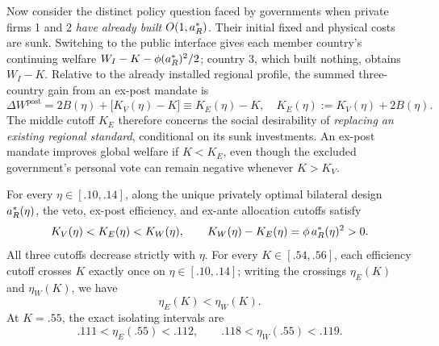 Now consider the distinct policy question faced by governments when private firms 1 and 2 \emph{have already built} \(O(1,a_R^*)\). Their initial fixed and physical costs are sunk. Switching to the public interface gives each member country's continuing welfare
\(W_I-K-\phi(a_R^*)^2/2\); country 3, which built nothing, obtains \(W_I-K\). Relative to the already installed regional profile, the summed three-country gain from an ex-post mandate is
\begin{equation}
 \Delta W^{\mathrm{post}}
 =2B(\eta)+\bigl[K_V(\eta)-K\bigr]
 \equiv K_E(\eta)-K,
 \quad
 K_E(\eta):=K_V(\eta)+2B(\eta).
 \label{eq:ke}
\end{equation}
The middle cutoff \(K_E\) therefore concerns the social desirability of \emph{replacing an existing regional standard}, conditional on its sunk investments. An ex-post mandate improves global welfare if \(K<K_E\), even though the excluded government's personal vote can remain negative whenever \(K>K_V\).

\begin{proposition}
\label{prop:thresholds}
For every \(\eta\in[.10,.14]\), along the unique privately
optimal bilateral design \(a_R^*(\eta)\), the veto,
ex-post efficiency, and ex-ante allocation cutoffs satisfy
\begin{equation}
 K_V(\eta)<K_E(\eta)<K_W(\eta),\qquad
 K_W(\eta)-K_E(\eta)=\phi\,a_R^*(\eta)^2>0.
 \label{eq:threshold-chain}
\end{equation}
All three cutoffs decrease strictly with \(\eta\).
For every \(K\in[.54,.56]\), each efficiency cutoff crosses \(K\)
exactly once on \(\eta\in[.10,.14]\); writing the crossings
\(\eta_E(K)\) and \(\eta_W(K)\), we have
\begin{equation}
 \eta_E(K)<\eta_W(K).
 \label{eq:eta-order}
\end{equation}
At \(K=.55\), the exact isolating intervals are
\[
 .111<\eta_E(.55)<.112,\qquad
 .118<\eta_W(.55)<.119.
\]
\end{proposition}

